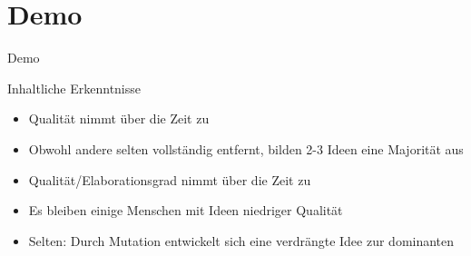 \section{Demo}
\begin{frame} {Demo}
\end{frame}

\begin{frame} {Inhaltliche Erkenntnisse}
	\begin{itemize}
		\item Qualität nimmt über die Zeit zu
		\item Obwohl andere selten vollständig entfernt, bilden 2-3 Ideen eine Majorität aus
		\item Qualität/Elaborationsgrad nimmt über die Zeit zu
		\item Es bleiben einige Menschen mit Ideen niedriger Qualität
		\item Selten: Durch Mutation entwickelt sich eine verdrängte Idee zur dominanten
	\end{itemize}
\end{frame}
